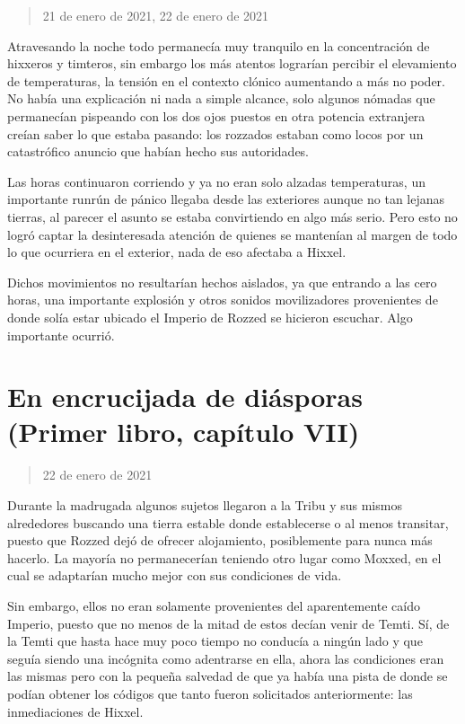 \documentclass[
  spanish,
]{book}
\begin{document}
\begin{quote}
21 de enero de 2021, 22 de enero de 2021
\end{quote}

Atravesando la noche todo permanecía muy tranquilo en la concentración de hixxeros y timteros, sin embargo los más atentos lograrían percibir el elevamiento de temperaturas, la tensión en el contexto clónico aumentando a más no poder. No había una explicación ni nada a simple alcance, solo algunos nómadas que permanecían pispeando con los dos ojos puestos en otra potencia extranjera creían saber lo que estaba pasando: los rozzados estaban como locos por un catastrófico anuncio que habían hecho sus autoridades.

Las horas continuaron corriendo y ya no eran solo alzadas temperaturas, un importante runrún de pánico llegaba desde las exteriores aunque no tan lejanas tierras, al parecer el asunto se estaba convirtiendo en algo más serio. Pero esto no logró captar la desinteresada atención de quienes se mantenían al margen de todo lo que ocurriera en el exterior, nada de eso afectaba a Hixxel.

Dichos movimientos no resultarían hechos aislados, ya que entrando a las cero horas, una importante explosión y otros sonidos movilizadores provenientes de donde solía estar ubicado el Imperio de Rozzed se hicieron escuchar. Algo importante ocurrió.

\hypertarget{en-encrucijada-de-diuxe1sporas-primer-libro-capuxedtulo-vii}{%
\section{En encrucijada de diásporas (Primer libro, capítulo VII)}\label{en-encrucijada-de-diuxe1sporas-primer-libro-capuxedtulo-vii}}

\begin{quote}
22 de enero de 2021
\end{quote}

Durante la madrugada algunos sujetos llegaron a la Tribu y sus mismos alrededores buscando una tierra estable donde establecerse o al menos transitar, puesto que Rozzed dejó de ofrecer alojamiento, posiblemente para nunca más hacerlo. La mayoría no permanecerían teniendo otro lugar como Moxxed, en el cual se adaptarían mucho mejor con sus condiciones de vida.

Sin embargo, ellos no eran solamente provenientes del aparentemente caído Imperio, puesto que no menos de la mitad de estos decían venir de Temti. Sí, de la Temti que hasta hace muy poco tiempo no conducía a ningún lado y que seguía siendo una incógnita como adentrarse en ella, ahora las condiciones eran las mismas pero con la pequeña salvedad de que ya había una pista de donde se podían obtener los códigos que tanto fueron solicitados anteriormente: las inmediaciones de Hixxel.
\end{document}
